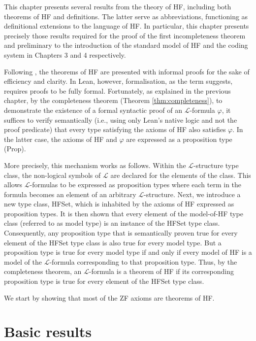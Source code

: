 This chapter presents several results from the theory of HF, 
including both theorems of HF and definitions. The latter serve as abbreviations, 
functioning as definitional extensions to the language of HF.
In particular, this chapter presents precisely those results required for the proof
of the first incompleteness theorem and preliminary to the introduction of the standard model of HF
and the coding system in Chapters 3 and 4 respectively.

Following \cite{swierczkowski2003finite}, the theorems of HF are presented with informal proofs 
for the sake of efficiency and clarity. 
In Lean, however, formalisation, as the term suggests, requires proofs to be fully formal. 
Fortunately, as explained in the previous chapter, by the completeness theorem 
(Theorem \ref{thm:completeness}), to demonstrate the existence of a formal syntactic proof of 
an $\mathcal{L}$-formula $\varphi$, 
it suffices to verify semantically 
(i.e., using only Lean's native logic and not the proof predicate) that 
every type satisfying the axioms of HF also satisfies $\varphi$. 
In the latter case, the axioms of HF and $\varphi$ are expressed as a proposition type 
({\ttfamily \small Prop}).

More precisely, this mechanism works as follows.
Within the $\mathcal{L}$-structure type class, the non-logical symbols of $\mathcal{L}$ are 
declared for the elements of the class. 
This allows $\mathcal{L}$-formulas to be expressed
as proposition types where each term in the formula becomes an element of an 
arbitrary $\mathcal{L}$-structure. Next, we introduce a new type class, {\ttfamily \small HFSet}, 
which is inhabited by the axioms of HF expressed as proposition types. 
It is then shown that every element of the model-of-HF type class 
(referred to as model type) is an instance of the {\ttfamily \small HFSet} type class.
Consequently, any proposition type that is semantically proven true for every element of 
the {\ttfamily \small HFSet} type class is also true for every model type.
But a proposition type is true for every model type if and only if 
every model of HF is a model of the $\mathcal{L}$-formula corresponding to that proposition type.
Thus, by the completeness theorem, an $\mathcal{L}$-formula is a theorem of HF if its corresponding 
proposition type is true for every element of the {\ttfamily \small HFSet} type class.

We start by showing that most of the ZF axioms are theorems of HF.

\section{Basic results}


